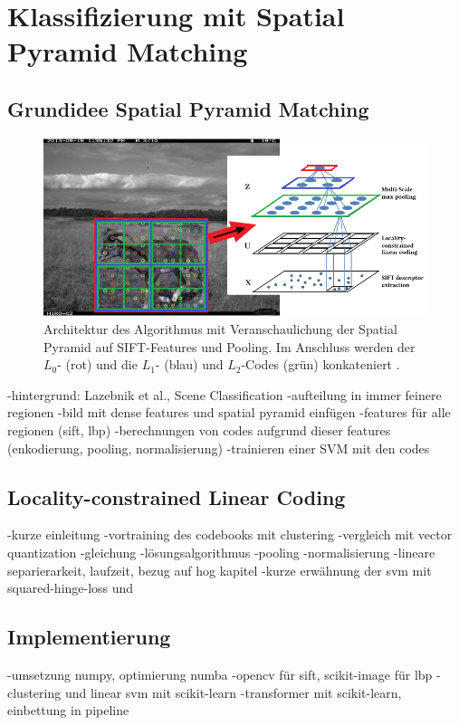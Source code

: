 \section{Klassifizierung mit Spatial Pyramid Matching}

\subsection{Grundidee Spatial Pyramid Matching}

\begin{figure}
	\centering
	\includegraphics[scale=1]{img/sift_spm.png}
	\caption{Architektur des Algorithmus mit Veranschaulichung der Spatial Pyramid auf SIFT-Features und Pooling. Im Anschluss werden der $L_0$- (rot) und die $L_1$- (blau) und $L_2$-Codes (grün) konkateniert \cite{yygh09}.}
\end{figure}

-hintergrund: Lazebnik et al., Scene Classification
-aufteilung in immer feinere regionen
-bild mit dense features und spatial pyramid einfügen
-features für alle regionen (sift, lbp)
-berechnungen von codes aufgrund dieser features (enkodierung, pooling, normalisierung)
-trainieren einer SVM mit den codes

\subsection{Locality-constrained Linear Coding}

-kurze einleitung
-vortraining des codebooks mit clustering
-vergleich mit vector quantization
-gleichung
-lösungsalgorithmus
-pooling
-normalisierung
-lineare separierarkeit, laufzeit, bezug auf hog kapitel
-kurze erwähnung der svm mit squared-hinge-loss und 

\subsection{Implementierung}

-umsetzung numpy, optimierung numba
-opencv für sift, scikit-image für lbp
-clustering und linear svm mit scikit-learn
-transformer mit scikit-learn, einbettung in pipeline